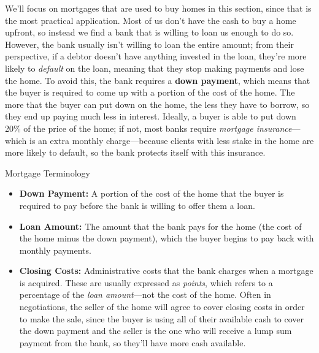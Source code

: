 We'll focus on mortgages that are used to buy homes in this section, since that is the most practical application.  Most of us don't have the cash to buy a home upfront, so instead we find a bank that is willing to loan us enough to do so.  However, the bank usually isn't willing to loan the entire amount; from their perspective, if a debtor doesn't have anything invested in the loan, they're more likely to \textit{default} on the loan, meaning that they stop making payments and lose the home.  To avoid this, the bank requires a \textbf{down payment}, which means that the buyer is required to come up with a portion of the cost of the home.  The more that the buyer can put down on the home, the less they have to borrow, so they end up paying much less in interest.  Ideally, a buyer is able to put down 20\% of the price of the home; if not, most banks require \textit{mortgage insurance}---which is an extra monthly charge---because clients with less stake in the home are more likely to default, so the bank protects itself with this insurance.

\begin{proc}{Mortgage Terminology}
\begin{itemize}
\item \textbf{Down Payment:} A portion of the cost of the home that the buyer is required to pay before the bank is willing to offer them a loan.
\item \textbf{Loan Amount:} The amount that the bank pays for the home (the cost of the home minus the down payment), which the buyer begins to pay back with monthly payments.
\item \textbf{Closing Costs:} Administrative costs that the bank charges when a mortgage is acquired.  These are usually expressed as \textit{points}, which refers to a percentage of the \textit{loan amount}---not the cost of the home.  Often in negotiations, the seller of the home will agree to cover closing costs in order to make the sale, since the buyer is using all of their available cash to cover the down payment and the seller is the one who will receive a lump sum payment from the bank, so they'll have more cash available.
\end{itemize}
\end{proc}

